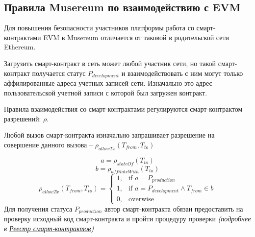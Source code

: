 \documentclass[12pt]{report}
\begin{document}
\subsection{Правила Musereum по взаимодействию с EVM}
\label{tech-blockchain-rules}
\begin{multicols}{2}
Для повышения безопасности участников платформы работа со смарт-контрактами EVM в Musereum отличается от таковой в родительской сети Ethereum.

Загрузить смарт-контракт в сеть может любой участник сети, но такой смарт-контракт получается статус $P_{development}$ и взаимодействовать с ним могут только аффилированные адреса учетных записей сети. Изначально это адрес пользовательской учетной записи с которой был загружен контракт.

Правила взаимодействия со смарт-контрактами регулируются смарт-контрактом разрешений: $\rho$.

Любой вызов смарт-контракта изначально запрашивает разрешение на совершение данного вызова – $\rho_{allowTx}(T_{from}, T_{to})$
\end{multicols}
\begin{equation}
a = \rho_{stateOf}(T_{to})
\end{equation}
\begin{equation}
b = \rho_{affilateWith}(T_{to})
\end{equation}
\begin{equation}
\rho_{allowTx}(T_{from}, T_{to}) = \begin{cases}1, & \text{if } a = P_{production} \\ 1, & \text{if } a = P_{development} \wedge T_{from} \in b \\ 0, & \text{overwise} \end{cases}
\end{equation}
Для получения статуса $P_{production}$ автор смарт-контракта обязан предоставить на проверку исходный код смарт-контракта и пройти процедуру проверки \textit{(подробнее в \hyperref[tech-apps-contracts-registry]{Реестр смарт-контрактов})}

\def\Owner{Владелец контракта}
\def\Blockchain{Блокчейн}
\def\Registry{Реестр контрактов}
\def\LoadByteCode{Загрузка байткода в блокчейн}
\def\LoadSourceCode{Загрузка исходного кода}
\def\ValidationEnded{Код прошел проверку?}
\def\ChangeStatus{Смена состояния смарт-контракта}
\end{document}
